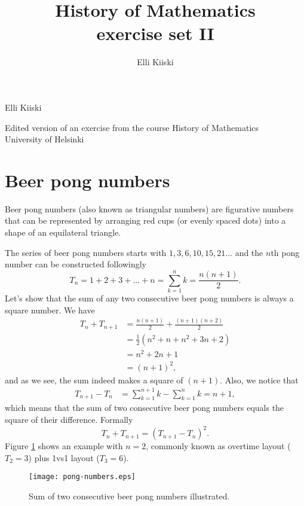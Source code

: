 \documentclass{article}
\title{History of Mathematics\\exercise set II}
\author{Elli Kiiski}
\begin{document}
{\large
Elli Kiiski
\par
Edited version of an exercise from the course History of Mathematics\\University of Helsinki
}
\vspace{0.5cm}


\section*{Beer pong numbers}

Beer pong numbers (also known as triangular numbers) are figurative numbers that can be represented by arranging red cups (or evenly spaced dots) into a shape of an equilateral triangle.

The series of beer pong numbers starts with $1,3,6,10,15,21...$ and the $n$th pong number can be constructed followingly
\begin{equation*}
\label{kolmiosumma}
    T_n = 1+2+3+...+n = \sum_{k=1}^n k = \frac{n(n+1)}{2}.
\end{equation*}
Let's show that the sum of any two consecutive beer pong numbers is always a square number. We have
\begin{align*}
    T_n + T_{n+1} & = \frac{n(n+1)}{2} + \frac{(n+1)(n+2)}{2}\\
    & = \frac{1}{2}(n^2+n+n^2+3n+2)\\
    & = n^2+2n+1\\
    & = (n+1)^2,
\end{align*}
and as we see, the sum indeed makes a square of $(n+1)$. Also,  we notice that
\begin{align*}
    T_{n+1} - T_n & = \sum_{k=1}^{n+1} k - \sum_{k=1}^n k = n+1,
\end{align*}
which means that the sum of two consecutive beer pong numbers equals the square of their difference. Formally
\begin{equation*}
    T_n + T_{n+1} = (T_{n+1} - T_n)^2.
\end{equation*}
Figure \ref{fig:pong} shows an example with $n=2$, commonly known as overtime layout ($T_2=3$) plus 1vs1 layout ($T_3=6$).
\begin{figure}
    \centering
    \texttt{[image: pong-numbers.eps]}
    \caption{Sum of two consecutive beer pong numbers illustrated.}
    \label{fig:pong}
\end{figure}
\end{document}
